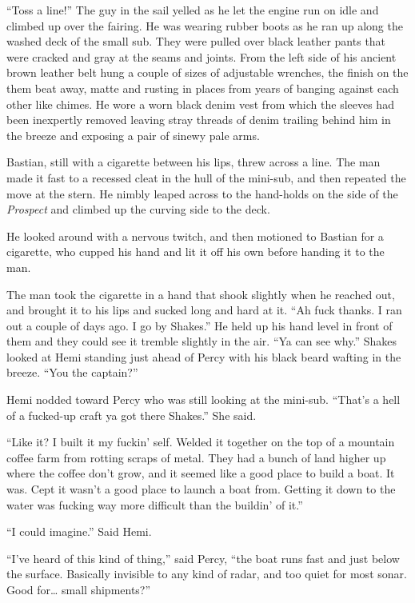 \documentclass[
]{scrbook}
\begin{document}
``Toss a line!'' The guy in the sail yelled as he let the engine run on
idle and climbed up over the fairing. He was wearing rubber boots as he
ran up along the washed deck of the small sub. They were pulled over
black leather pants that were cracked and gray at the seams and joints.
From the left side of his ancient brown leather belt hung a couple of
sizes of adjustable wrenches, the finish on the them beat away, matte
and rusting in places from years of banging against each other like
chimes. He wore a worn black denim vest from which the sleeves had been
inexpertly removed leaving stray threads of denim trailing behind him in
the breeze and exposing a pair of sinewy pale arms.

Bastian, still with a cigarette between his lips, threw across a line.
The man made it fast to a recessed cleat in the hull of the mini-sub,
and then repeated the move at the stern. He nimbly leaped across to the
hand-holds on the side of the \emph{Prospect} and climbed up the curving
side to the deck.

He looked around with a nervous twitch, and then motioned to Bastian for
a cigarette, who cupped his hand and lit it off his own before handing
it to the man.

The man took the cigarette in a hand that shook slightly when he reached
out, and brought it to his lips and sucked long and hard at it. ``Ah
fuck thanks. I ran out a couple of days ago. I go by Shakes.'' He held
up his hand level in front of them and they could see it tremble
slightly in the air. ``Ya can see why.'' Shakes looked at Hemi standing
just ahead of Percy with his black beard wafting in the breeze. ``You
the captain?''

Hemi nodded toward Percy who was still looking at the mini-sub. ``That's
a hell of a fucked-up craft ya got there Shakes.'' She said.

``Like it? I built it my fuckin' self. Welded it together on the top of
a mountain coffee farm from rotting scraps of metal. They had a bunch of
land higher up where the coffee don't grow, and it seemed like a good
place to build a boat. It was. Cept it wasn't a good place to launch a
boat from. Getting it down to the water was fucking way more difficult
than the buildin' of it.''

``I could imagine.'' Said Hemi.

``I've heard of this kind of thing,'' said Percy, ``the boat runs fast
and just below the surface. Basically invisible to any kind of radar,
and too quiet for most sonar. Good for\ldots{} small shipments?''
\end{document}
